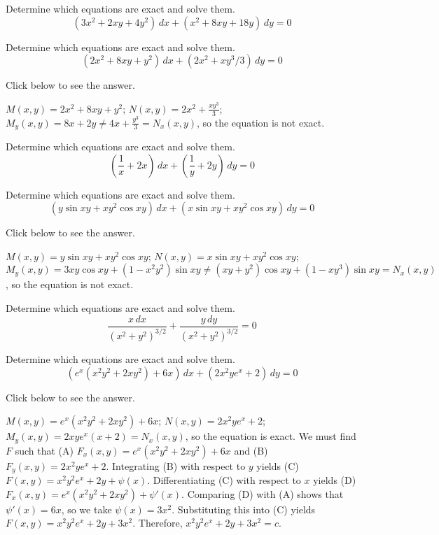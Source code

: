 \documentclass{ximera}
\begin{document}
\begin{problem}\label{exer:2.5.9} Determine which equations are exact and solve them.
$$(3x^2+2xy+4y^2)\,dx+(x^2+8xy+18y)\,dy=0$$
\end{problem}

\begin{problem}\label{exer:2.5.10} Determine which equations are exact and solve them.
$$(2x^2+8xy+y^2)\,dx+(2x^2+xy^3/3)\,dy=0$$

Click below to see the answer.

\begin{expandable}
    $M(x,y)=2x^2+8xy+y^2$;\;
$N(x,y)=2x^2+\frac{xy^3}{3}$;\;
$M_y(x,y)=8x+2y\neq 4x+\frac{y^3}{3}=N_x(x,y)$,
so the  equation is not exact.
\end{expandable}
\end{problem}

\begin{problem}\label{exer:2.5.11} Determine which equations are exact and solve them.
$$\left(\frac{1}{x}+2x\right)\,dx+\left(\frac{1}{y}+2y\right)\,dy=0$$
\end{problem}

\begin{problem}\label{exer:2.5.12} Determine which equations are exact and solve them.
$$(y\sin xy+xy^2\cos xy)\,dx+(x\sin xy+xy^2\cos xy)\,dy=0$$

Click below to see the answer.

\begin{expandable}
    $M(x,y)=y\sin xy+xy^2\cos xy$;\;
$N(x,y)=x\sin xy+xy^2\cos xy$;\;
$M_y(x,y)=3xy\cos xy+(1-x^2y^2)\sin xy\neq (xy+y^2)\cos
xy+(1-xy^3)\sin xy=N_x(x,y)$, so the equation is not exact.
\end{expandable}
\end{problem}

\begin{problem}\label{exer:2.5.13} Determine which equations are exact and solve them.
$$\frac{x\,dx}{(x^2+y^2)^{3/2}}+\frac{y\,dy}{(x^2+y^2)^{3/2}}=0$$
\end{problem}

\begin{problem}\label{exer:2.5.14} Determine which equations are exact and solve them.
$$\left(e^x(x^2y^2+2xy^2)+6x\right)\,dx+(2x^2ye^x+2)\,dy=0$$

Click below to see the answer.

\begin{expandable}
    $M(x,y)=e^x(x^2y^2+2xy^2)+6x$;\;
$N(x,y)=2x^2ye^x+2$;\;
$M_y(x,y)=2xye^x(x+2)=N_x(x,y)$,
so the  equation is  exact.
We must find $F$ such that
(A) $F_x(x,y)=e^x(x^2y^2+2xy^2)+6x$ and
(B) $F_y(x,y)=2x^2ye^x+2$.
Integrating (B) with respect to $y$ yields
(C) $F(x,y)=x^2y^2e^x+2y+\psi(x)$.
Differentiating (C) with respect to $x$  yields
(D) $F_x(x,y)=e^x(x^2y^2+2xy^2)+\psi'(x)$.
Comparing (D) with (A)  shows that
$\psi'(x)=6x$, so we take
$\psi(x)=3x^2$.
Substituting this into (C) yields
$F(x,y)=x^2y^2e^x+2y+3x^2$.
Therefore, $x^2y^2e^x+2y+3x^2=c$.
\end{expandable}
\end{problem}
\end{document}
